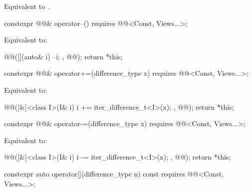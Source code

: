 \begin{itemdescr}
\pnum
\effects
Equivalent to .
\end{itemdescr}

%
\begin{itemdecl}
constexpr @@& operator--() requires @@<Const, Views...>;
\end{itemdecl}

\begin{itemdescr}
\pnum
\effects
Equivalent to:
\begin{codeblock}
@@([](auto& i) { --i; }, @@);
return *this;
\end{codeblock}
\end{itemdescr}

%
\begin{itemdecl}
constexpr @@& operator+=(difference_type x)
  requires @@<Const, Views...>;
\end{itemdecl}

\begin{itemdescr}
\pnum
\effects
Equivalent to:
\begin{codeblock}
@@([&]<class I>(I& i) { i += iter_difference_t<I>(x); }, @@);
return *this;
\end{codeblock}
\end{itemdescr}

%
\begin{itemdecl}
constexpr @@& operator-=(difference_type x)
  requires @@<Const, Views...>;
\end{itemdecl}

\begin{itemdescr}
\pnum
\effects
Equivalent to:
\begin{codeblock}
@@([&]<class I>(I& i) { i -= iter_difference_t<I>(x); }, @@);
return *this;
\end{codeblock}
\end{itemdescr}

%
\begin{itemdecl}
constexpr auto operator[](difference_type n) const
  requires @@<Const, Views...>;
\end{itemdecl}


